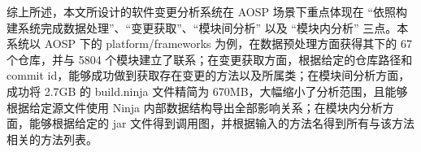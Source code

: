 综上所述，本文所设计的软件变更分析系统在 AOSP 场景下重点体现在 “依照构建系统完成数据处理”、“变更获取”、“模块间分析” 以及 “模块内分析” 三点。本系统以 AOSP 下的 platform/frameworks 为例，在数据预处理方面获得其下的 67 个仓库，并与 5804 个模块建立了联系；在变更获取方面，根据给定的仓库路径和 commit id，能够成功做到获取存在变更的方法以及所属类；在模块间分析方面，成功将 2.7GB 的 build.ninja 文件精简为 670MB，大幅缩小了分析范围，且能够根据给定源文件使用 Ninja 内部数据结构导出全部影响关系；在模块内分析方面，能够根据给定的 jar 文件得到调用图，并根据输入的方法名得到所有与该方法相关的方法列表。
